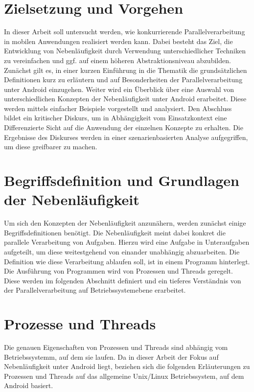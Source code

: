 \documentclass[12pt,oneside,a4paper,bibtotoc,liststotoc]{scrreprt}
\begin{document}
\section{Zielsetzung und Vorgehen}
In dieser Arbeit soll untersucht werden, wie konkurrierende Parallelverarbeitung in mobilen Anwendungen realisiert werden kann. Dabei besteht das Ziel, die Entwicklung von Nebenläufigkeit durch Verwendung unterschiedlicher Techniken zu vereinfachen und ggf. auf einem höheren Abstraktionsniveau abzubilden. Zunächst gilt es, in einer kurzen Einführung in die Thematik die grundsätzlichen Definitionen kurz zu erläutern und auf Besonderheiten der Parallelverarbeitung unter Android einzugehen. Weiter wird ein Überblick über eine Auswahl von unterschiedlichen Konzepten der Nebenläufigkeit unter Android erarbeitet. Diese werden mittels einfacher Beispiele vorgestellt und analysiert. Den Abschluss bildet ein kritischer Diskurs, um in Abhängigkeit vom Einsatzkontext eine Differenzierte Sicht auf die Anwendung der einzelnen Konzepte zu erhalten. Die Ergebnisse des Diskurses werden in einer szenarienbasierten Analyse aufgegriffen, um diese greifbarer zu machen.

\section{Begriffsdefinition und Grundlagen der Nebenläufigkeit}
Um sich den Konzepten der Nebenläufigkeit anzunähern, werden zunächst einige Begriffsdefinitionen benötigt. Die Nebenläufigkeit meint dabei konkret die parallele Verarbeitung von Aufgaben. Hierzu wird eine Aufgabe in Unteraufgaben aufgeteilt, um diese  weitestgehend von einander unabhängig abzuarbeiten. Die Definition wie diese Verarbeitung ablaufen soll, ist in einem Programm hinterlegt. Die Ausführung von Programmen wird von Prozessen und Threads geregelt. Diese werden im folgenden Abschnitt definiert und ein tieferes Verständnis von der Parallelverarbeitung auf Betriebssystemebene erarbeitet.

\section{Prozesse und Threads}
Die genauen Eigenschaften von Prozessen und Threads sind abhängig vom Betriebssystemm, auf dem sie laufen. Da in dieser Arbeit der Fokus auf Nebenläufigkeit unter Android liegt, beziehen sich die folgenden Erläuterungen zu Prozessen und Threads auf das allgemeine Unix/Linux Betriebssystem, auf dem Android basiert.
\end{document}
